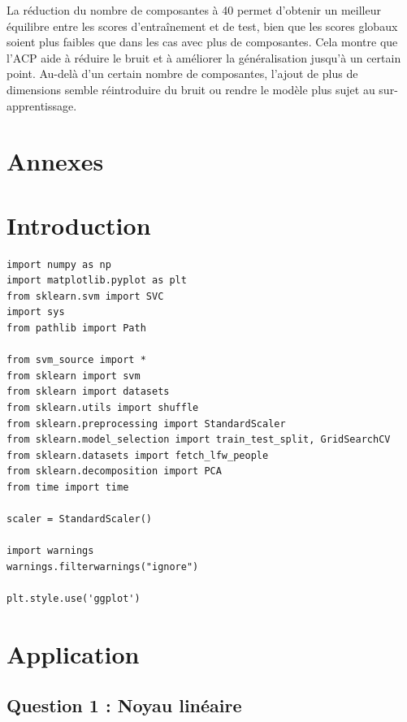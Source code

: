 \documentclass{article}
\begin{document}
\hspace{7pt} La réduction du nombre de composantes à 40 permet d'obtenir un meilleur équilibre entre les scores d'entraînement et de test, bien que les scores globaux soient plus faibles que dans les cas avec plus de composantes. Cela montre que l'ACP aide à réduire le bruit et à améliorer la généralisation jusqu'à un certain point. Au-delà d'un certain nombre de composantes, l'ajout de plus de dimensions semble réintroduire du bruit ou rendre le modèle plus sujet au sur-apprentissage.

\newpage



\appendix
\section*{Annexes}

\section*{Introduction}

\begin{lstlisting}
import numpy as np
import matplotlib.pyplot as plt
from sklearn.svm import SVC
import sys
from pathlib import Path

from svm_source import *
from sklearn import svm
from sklearn import datasets
from sklearn.utils import shuffle
from sklearn.preprocessing import StandardScaler
from sklearn.model_selection import train_test_split, GridSearchCV
from sklearn.datasets import fetch_lfw_people
from sklearn.decomposition import PCA
from time import time

scaler = StandardScaler()

import warnings
warnings.filterwarnings("ignore")

plt.style.use('ggplot')
\end{lstlisting}

\section*{Application}

\subsection*{Question 1 : Noyau linéaire}
\end{document}
